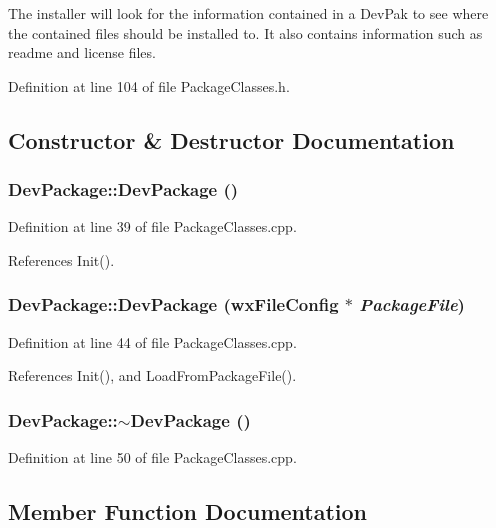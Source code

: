 The installer will look for the information contained in a Dev\-Pak to see where the contained files should be installed to. It also contains information such as readme and license files. 



Definition at line 104 of file Package\-Classes.h.

\subsection{Constructor \& Destructor Documentation}
\subsubsection{\setlength{\rightskip}{0pt plus 5cm}Dev\-Package::Dev\-Package ()}\label{class_dev_package_9a3a9e60eb3eebae2db59060bfb71348}




Definition at line 39 of file Package\-Classes.cpp.

References Init().
\subsubsection{\setlength{\rightskip}{0pt plus 5cm}Dev\-Package::Dev\-Package (wx\-File\-Config $\ast$ {\em Package\-File})}\label{class_dev_package_40d29cdd7e1ec43bde701b6c0a6f5291}




Definition at line 44 of file Package\-Classes.cpp.

References Init(), and Load\-From\-Package\-File().
\subsubsection{\setlength{\rightskip}{0pt plus 5cm}Dev\-Package::$\sim$Dev\-Package ()}\label{class_dev_package_bc5ab86f718a3e55ef27a97713469468}




Definition at line 50 of file Package\-Classes.cpp.

\subsection{Member Function Documentation}
